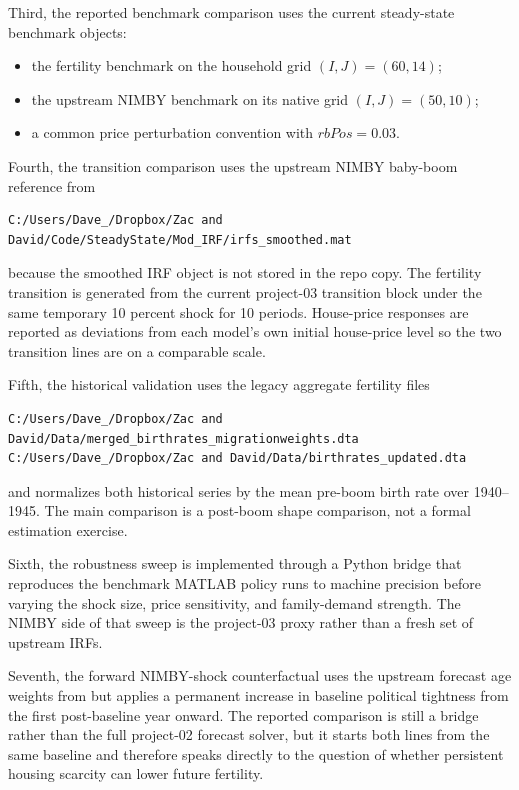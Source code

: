 \documentclass[11pt]{article}
\begin{document}
Third, the reported benchmark comparison uses the current steady-state benchmark objects:
\begin{itemize}
\item the fertility benchmark on the household grid $(I,J)=(60,14)$;
\item the upstream NIMBY benchmark on its native grid $(I,J)=(50,10)$;
\item a common price perturbation convention with $rbPos=0.03$.
\end{itemize}

Fourth, the transition comparison uses the upstream NIMBY baby-boom reference from
\begin{verbatim}
C:/Users/Dave_/Dropbox/Zac and David/Code/SteadyState/Mod_IRF/irfs_smoothed.mat
\end{verbatim}
because the smoothed IRF object is not stored in the repo copy. The fertility transition is
generated from the current project-03 transition block under the same temporary 10 percent shock
for 10 periods. House-price responses are reported as deviations from each model's own initial
house-price level so the two transition lines are on a comparable scale.

Fifth, the historical validation uses the legacy aggregate fertility files
\begin{verbatim}
C:/Users/Dave_/Dropbox/Zac and David/Data/merged_birthrates_migrationweights.dta
C:/Users/Dave_/Dropbox/Zac and David/Data/birthrates_updated.dta
\end{verbatim}
and normalizes both historical series by the mean pre-boom birth rate over 1940--1945. The main
comparison is a post-boom shape comparison, not a formal estimation exercise.

Sixth, the robustness sweep is implemented through a Python bridge that reproduces the benchmark
MATLAB policy runs to machine precision before varying the shock size, price sensitivity, and
family-demand strength. The NIMBY side of that sweep is the project-03 proxy rather than a fresh
set of upstream IRFs.

Seventh, the forward NIMBY-shock counterfactual uses the upstream forecast age weights from
but applies a permanent increase in baseline political tightness from the first post-baseline year
onward. The reported comparison is still a bridge rather than the full project-02 forecast solver,
but it starts both lines from the same baseline and therefore speaks directly to the question of
whether persistent housing scarcity can lower future fertility.
\end{document}
